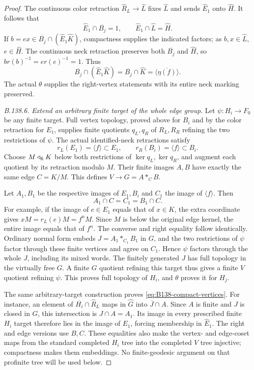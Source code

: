 \begin{proof}
The continuous color retraction $\widehat R_L\to\widehat L$
fixes $\widehat L$ and sends $\widehat E_1$ onto $\widehat H$.
It follows that
\begin{equation}\label{eq:B138-regional-compact}
\widehat E_1\cap\overline{B_j}=1,\qquad
\widehat E_1\cap\widehat L=\widehat H.
\end{equation}
If $b=e x\in\overline{B_j}\cap(\widehat E_1\widehat K)$,
compactness supplies the indicated factors; as $b,x\in\widehat L$,
$e\in\widehat H$. The continuous neck retraction preserves both
$\overline{B_j}$ and $\widehat H$, so
$b r(b)^{-1}=e r(e)^{-1}=1$. Thus
\begin{equation}\label{eq:B138-product-comparison}
\overline{B_j}\cap(\widehat E_1\widehat K)
=\overline{B_j}\cap\widehat K
=\overline{\langle\eta(f)\rangle}.
\end{equation}
The actual $\theta$ supplies the right-vertex statements with its
entire neck marking preserved.

\emph{B.138.6. Extend an arbitrary finite target of the whole edge group.}
Let $\psi:H_i\to F_0$ be any finite target. Full vertex topology,
proved above for $B_i$ and by the color retraction for $E_1$, supplies
finite quotients $q_L,q_R$ of $R_L,R_R$ refining the two restrictions
of $\psi$. The actual identified-neck retractions satisfy
\[
r_L(E_1)=\langle f\rangle\subset E_1,\qquad
r_R(B_i)=\langle f\rangle\subset B_i.
\]
Choose $M\triangleleft_{\rm fi}K$ below both restrictions of
$\ker q_L,\ker q_R$, and augment each quotient by its retraction
modulo $M$. Their finite images $A,B$ have exactly the same edge
$C=K/M$. This defines $V\to G=A*_CB$.

Let $A_1,B_1$ be the respective images of $E_1,B_i$ and $C_1$
the image of $\langle f\rangle$. Then
\[
A_1\cap C=C_1=B_1\cap C.
\]
For example, if the image of $e\in E_1$ equals that of $x\in K$,
the extra coordinate gives $xM=r_L(e)M=f^nM$. Since $M$ is below
the original edge kernel, the entire image equals that of $f^n$.
The converse and right equality follow identically. Ordinary normal
form embeds $J=A_1*_{C_1}B_1$ in $G$, and the two restrictions of
$\psi$ factor through these finite vertices and agree on $C_1$.
Hence $\psi$ factors through the whole $J$, including its mixed words.
The finitely generated $J$ has full topology in the virtually free $G$.
A finite $G$ quotient refining this target thus gives a finite $V$
quotient refining $\psi$. This proves full topology of $H_i$, and
$\theta$ proves it for $H_j$.

The same arbitrary-target construction proves
\eqref{eq:B138-compact-vertices}. For instance, an element of
$\overline{H_i}\cap\widehat R_L$ maps in $\widehat G$ into
$\overline J\cap A$. Since $A$ is finite and $J$ is closed in $G$,
this intersection is $J\cap A=A_1$. Its image in every prescribed
finite $H_i$ target therefore lies in the image of $E_1$, forcing
membership in $\widehat E_1$. The right and edge versions use $B,C$.
These equalities also make the vertex- and edge-coset maps from the
standard completed $H_i$ tree into the completed $V$ tree injective;
compactness makes them embeddings. No finite-geodesic argument on
that profinite tree will be used below.


\end{proof}
